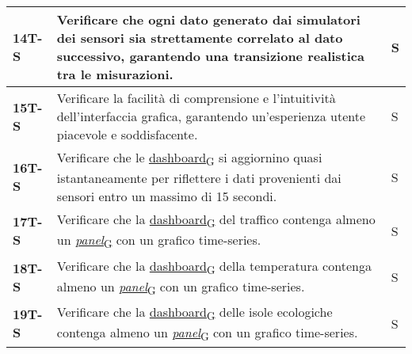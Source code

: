 \begin{longtable}{|>{\raggedright\arraybackslash}m{}|>{\raggedright\arraybackslash}m{}|>{\raggedright\arraybackslash}m{}|}
	\hline
	\textbf{14T-S}  & Verificare che ogni dato generato dai simulatori dei sensori sia strettamente correlato al dato successivo, garantendo una transizione realistica tra le misurazioni.                                                                                                                                                                                                                                    & S              \\
	\hline
	\textbf{15T-S}  & Verificare la facilità di comprensione e l'intuitività dell'interfaccia grafica, garantendo un'esperienza utente piacevole e soddisfacente.                                                                                                                                                                                                                                                              & S              \\
	\hline
	\textbf{16T-S}  & Verificare che le \href{https://7last.github.io/docs/pb/documentazione-interna/glossario\#dashboard}{dashboard\textsubscript{G}} si aggiornino quasi istantaneamente per riflettere i dati provenienti dai sensori entro un massimo di 15 secondi.                                                                                                                                                       & S              \\
	\hline
	\textbf{17T-S}  & Verificare che la \href{https://7last.github.io/docs/pb/documentazione-interna/glossario\#dashboard}{dashboard\textsubscript{G}} del traffico contenga almeno un \href{https://7last.github.io/docs/pb/documentazione-interna/glossario\#panel}{\textit{panel}\textsubscript{G}} con un grafico time-series.                                                                                             & S              \\
	\hline
	\textbf{18T-S}  & Verificare che la \href{https://7last.github.io/docs/pb/documentazione-interna/glossario\#dashboard}{dashboard\textsubscript{G}} della temperatura contenga almeno un \href{https://7last.github.io/docs/pb/documentazione-interna/glossario\#panel}{\textit{panel}\textsubscript{G}} con un grafico time-series.                                                                                        & S              \\
	\hline
	\textbf{19T-S}  & Verificare che la \href{https://7last.github.io/docs/pb/documentazione-interna/glossario\#dashboard}{dashboard\textsubscript{G}} delle isole ecologiche contenga almeno un \href{https://7last.github.io/docs/pb/documentazione-interna/glossario\#panel}{\textit{panel}\textsubscript{G}} con un grafico time-series.                                                                                   & S              \\

\end{longtable}
